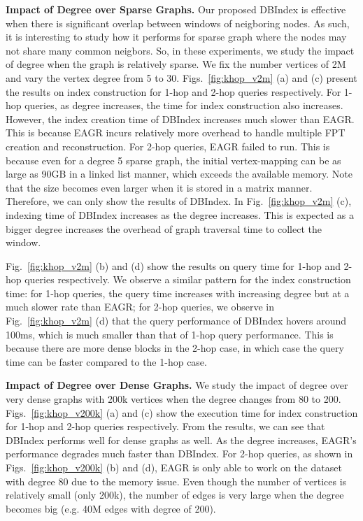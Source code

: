 \textbf{Impact of Degree over Sparse Graphs.} Our proposed DBIndex is effective when there is significant overlap between windows of neigboring nodes. As such, it is interesting to study how it performs for sparse graph where the nodes may not share many common neigbors. So, in these experiments, 
we study the impact of degree when the graph is relatively sparse.
We fix the number vertices of 2M and vary the vertex degree from 5 to 30. 
Figs.~\ref{fig:khop_v2m} (a) and (c) present the results 
on index construction for 1-hop and 2-hop queries respectively. 
For 1-hop queries, as degree increases, the time for index
construction also increases. 
However, the index creation time of DBIndex increases much 
slower than EAGR. This is because EAGR incurs relatively more 
overhead to handle multiple FPT creation and reconstruction. 
For 2-hop queries, EAGR failed to run. This is because even for 
a degree 5 sparse graph, the initial vertex-mapping can be as large 
as 90GB in a linked list manner, which exceeds the available memory. 
Note that the size becomes even larger when it is stored in a matrix manner.
Therefore, we can only show the results of DBIndex. 
In Fig.~\ref{fig:khop_v2m} (c), indexing time of DBIndex increases as the 
degree increases. This is expected as a bigger degree  
increases the overhead of graph traversal time to collect the window. 


Fig.~\ref{fig:khop_v2m} (b) and (d)
show the results on query time 
for 1-hop and 2-hop queries respectively. 
We observe a similar pattern for the index construction time:
for 1-hop queries, the query time increases with increasing degree
but at a much slower rate than EAGR; for 2-hop queries, we observe in Fig.~\ref{fig:khop_v2m} (d) that the
query performance of DBIndex hovers around 100ms, which is much 
smaller than that of 1-hop query performance. 
This is because there are more dense blocks in the 2-hop case, 
in which case the query time can be faster compared to the 1-hop case. 

\textbf{Impact of Degree over Dense Graphs.} We study the 
impact of degree over very dense graphs with 200k vertices 
when the degree changes from 80 to 200. 
Figs.~\ref{fig:khop_v200k} (a) and (c) show
the execution time for index construction 
for 1-hop and 2-hop queries respectively. From the results, 
we can see that DBIndex performs well for dense graphs as well. 
As the degree increases, EAGR's performance degrades much faster than DBIndex. For 2-hop queries,
as shown in Figs.~\ref{fig:khop_v200k} (b) and (d), EAGR is only able to work on 
the dataset with degree 80 due to the memory issue. 
Even though the number of vertices is relatively small (only 200k), 
the number of edges is very large when the degree becomes big 
(e.g. 40M edges with degree of 200). 

